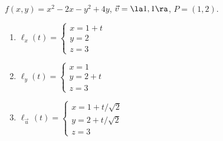 {$f(x,y) = x^2-2x-y^2+4y$,  $\vec v = \la 1,1\ra$, $P=(1,2)$.\label{12_06_ex_08}
}
{
\begin{enumerate}
	\item $\ell_x(t) = \left\{\begin{array}{l} x = 1+t\\ y = 2 \\ z = 3 \end{array} \right.$ 
	
	\item $\ell_y(t) = \left\{\begin{array}{l} x = 1\\ y = 2+t\\ z = 3 \end{array} \right.$
	
	\item $\ell_{\vec u\,}(t) = \left\{\begin{array}{l} x = 1+t/\sqrt{2}\\ y = 2+t/\sqrt{2} \\ z = 3 \end{array} \right.$
\end{enumerate}
}